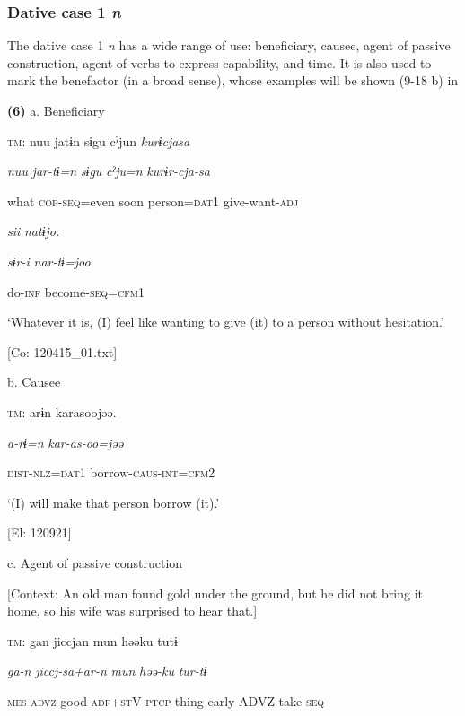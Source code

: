 \subsubsection{Dative case 1 \textit{n}}

The dative case 1 \textit{n} has a wide range of use: beneficiary, causee, agent of passive construction, agent of verbs to express capability, and time. It is also used to mark the benefactor (in a broad sense), whose examples will be shown (9-18 b) in 

\textbf{(6)}  a.  Beneficiary

    \textsc{tm}:  nuu  jatɨn  sɨgu  cˀjun  \textit{kurɨcjasa}

      \textit{nuu}  \textit{jar-tɨ=n}  \textit{sɨgu}  \textit{cˀju=n}  \textit{kurɨr-cja-sa}

      what  \textsc{cop}-\textsc{seq}=even  soon  person=\textsc{dat}1  give-want-\textsc{adj}

      \textit{sii}  \textit{natɨjo.}

      \textit{sɨr-i}  \textit{nar-tɨ=joo}

      do-\textsc{inf}  become-\textsc{seq}=\textsc{cfm}1

      ‘Whatever it is, (I) feel like wanting to give (it) to a person without hesitation.’

      [Co: 120415\_01.txt]

  b.  Causee

    \textsc{tm}:  arɨn  karasoojəə.

      \textit{a-rɨ=n}  \textit{kar-as-oo=jəə}

      \textsc{dist}-\textsc{nlz}=\textsc{dat}1  borrow-\textsc{caus}-\textsc{int}=\textsc{cfm}2

      ‘(I) will make that person borrow (it).’

      [El: 120921]

  c.  Agent of passive construction

    [Context: An old man found gold under the ground, but he did not bring it home, so his wife was surprised to hear that.]

    \textsc{tm}:  gan  jiccjan  mun  həəku  tutɨ

      \textit{ga-n}  \textit{jiccj-sa+ar-n}  \textit{mun}  \textit{həə-ku}  \textit{tur-tɨ}

      \textsc{mes}-\textsc{advz}  good-\textsc{adf}+\textsc{st}V-\textsc{ptcp}  thing  early-ADVZ  take-\textsc{seq}

